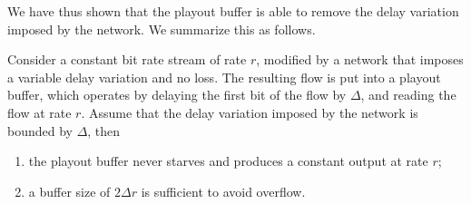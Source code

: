 We have thus shown that the playout buffer is able to remove the
delay variation imposed by the network. We summarize this as
follows.

\begin{proposition}
        Consider a constant bit rate stream of rate $r$, modified by a network
        that imposes a variable delay variation and no loss. The
        resulting flow is put into a playout buffer, which
        operates by delaying the first bit of the flow by
        $\Delta$, and reading the flow at rate $r$. Assume that the
        delay variation imposed by the network is bounded by $\Delta$, then
\begin{enumerate}
                \item  the playout buffer never starves and produces a constant
                output at rate $r$;
                \item  a buffer size of $2 \Delta r$ is sufficient to avoid overflow.
        \end{enumerate}
\end{proposition}
